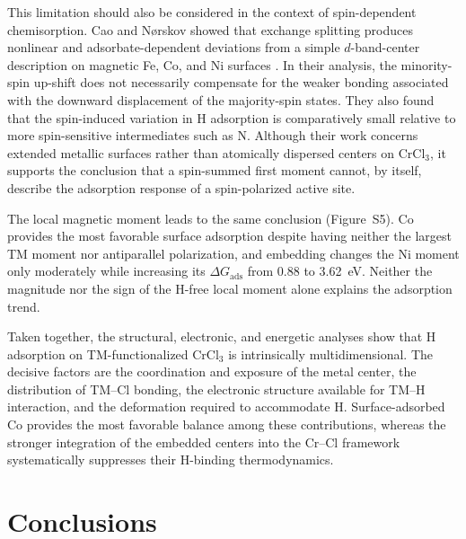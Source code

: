 \documentclass[journal=jacsat,manuscript=article]{achemso}
\begin{document}
This limitation should also be considered in the context of spin-dependent chemisorption. Cao and N{\o}rskov showed that exchange splitting produces nonlinear and adsorbate-dependent deviations from a simple $d$-band-center description on magnetic Fe, Co, and Ni surfaces \cite{doi:10.1021/acscatal.2c06319}. In their analysis, the minority-spin up-shift does not necessarily compensate for the weaker bonding associated with the downward displacement of the majority-spin states. They also found that the spin-induced variation in H adsorption is comparatively small relative to more spin-sensitive intermediates such as N. Although their work concerns extended metallic surfaces rather than atomically dispersed centers on CrCl$_3$, it supports the conclusion that a spin-summed first moment cannot, by itself, describe the adsorption response of a spin-polarized active site.

The local magnetic moment leads to the same conclusion (Figure~S5). Co provides the most favorable surface adsorption despite having neither the largest TM moment nor antiparallel polarization, and embedding changes the Ni moment only moderately while increasing its $\Delta G_{\mathrm{ads}}$ from 0.88 to 3.62~eV. Neither the magnitude nor the sign of the H-free local moment alone explains the adsorption trend.

Taken together, the structural, electronic, and energetic analyses show that H adsorption on TM-functionalized CrCl$_3$ is intrinsically multidimensional. The decisive factors are the coordination and exposure of the metal center, the distribution of TM--Cl bonding, the electronic structure available for TM--H interaction, and the deformation required to accommodate H. Surface-adsorbed Co provides the most favorable balance among these contributions, whereas the stronger integration of the embedded centers into the Cr--Cl framework systematically suppresses their H-binding thermodynamics.

\section{Conclusions}
\end{document}
